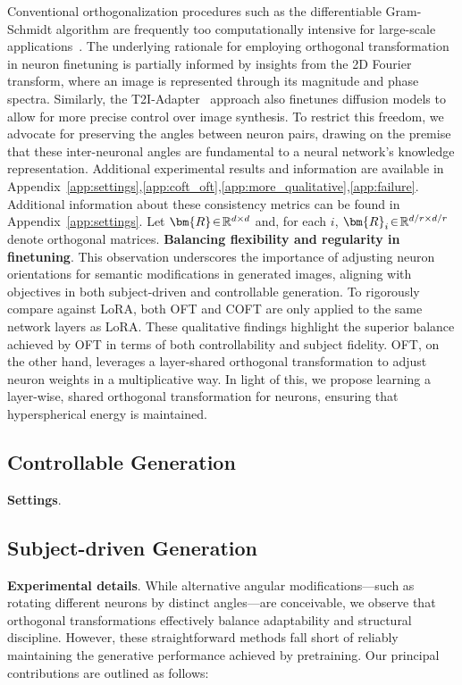 {Conventional orthogonalization procedures such as the differentiable Gram-Schmidt algorithm are frequently too computationally intensive for large-scale applications~\cite{liu2021orthogonal}. The underlying rationale for employing orthogonal transformation in neuron finetuning is partially informed by insights from the 2D Fourier transform, where an image is represented through its magnitude and phase spectra. Similarly, the T2I-Adapter~\cite{mou2023t2i} approach also finetunes diffusion models to allow for more precise control over image synthesis. To restrict this freedom, we advocate for preserving the angles between neuron pairs, drawing on the premise that these inter-neuronal angles are fundamental to a neural network's knowledge representation. Additional experimental results and information are available in Appendix~\ref{app:settings},\ref{app:coft_oft},\ref{app:more_qualitative},\ref{app:failure}. Additional information about these consistency metrics can be found in Appendix~\ref{app:settings}. Let $\thickmuskip=2mu \medmuskip=2mu \bm{R} \in \mathbb{R}^{d \times d}$ and, for each $i$, $\thickmuskip=2mu \medmuskip=2mu \bm{R}_i \in \mathbb{R}^{d/r \times d/r}$ denote orthogonal matrices. \textbf{Balancing flexibility and regularity in finetuning}. This observation underscores the importance of adjusting neuron orientations for semantic modifications in generated images, aligning with objectives in both subject-driven and controllable generation. To rigorously compare against LoRA, both OFT and COFT are only applied to the same network layers as LoRA. These qualitative findings highlight the superior balance achieved by OFT in terms of both controllability and subject fidelity. OFT, on the other hand, leverages a layer-shared orthogonal transformation to adjust neuron weights in a multiplicative way. In light of this, we propose learning a layer-wise, shared orthogonal transformation for neurons, ensuring that hyperspherical energy is maintained. \subsection{Controllable Generation}

\textbf{Settings}. \subsection{Subject-driven Generation}

\textbf{Experimental details}. While alternative angular modifications—such as rotating different neurons by distinct angles—are conceivable, we observe that orthogonal transformations effectively balance adaptability and structural discipline. However, these straightforward methods fall short of reliably maintaining the generative performance achieved by pretraining. Our principal contributions are outlined as follows:

}
